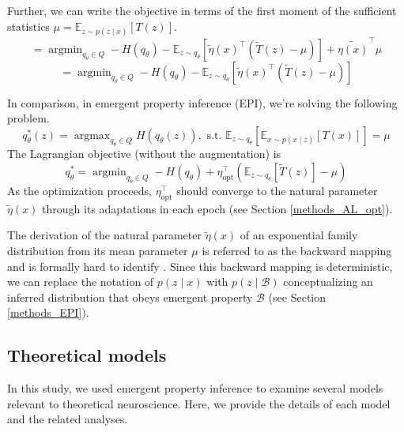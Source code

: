 \documentclass[11pt]{article}
\DeclareMathOperator*{\argmin}{argmin}
\DeclareMathOperator*{\argmax}{argmax}
\begin{document}
 Further, we can write the objective in terms of the first moment of the sufficient statistics $\mu = \mathbb{E}_{z \sim p(z \mid x)}\left[T(z) \right]$.
 \begin{equation}
=  \argmin_{q_\theta \in Q} -H(q_\theta) - \mathbb{E}_{z \sim q_\theta} \left[ \tilde{\eta}(x)^\top \left(  \tilde{T}(z) -\mu \right) \right] + \tilde{\eta(x)}^\top \mu
 \end{equation}
  \begin{equation}
=  \argmin_{q_\theta \in Q} -H(q_\theta) - \mathbb{E}_{z \sim q_\theta} \left[ \tilde{\eta}(x)^\top \left(  \tilde{T}(z) -\mu \right) \right]
 \end{equation}

In comparison, in emergent property inference (EPI), we're solving the following problem.
\begin{equation}
q_\theta^*(z) = \argmax_{q_\theta \in Q} H(q_\theta(z)),   \text{  s.t.  } \mathbb{E}_{z \sim q_\theta}\left[ \mathbb{E}_{x\sim p(x \mid z)}\left[T(x)\right] \right] = \mu
\end{equation}
The Lagrangian objective (without the augmentation) is
\begin{equation}
q_\theta^* = \argmin_{q_\theta \in Q} - H(q_\theta) + \eta_{\text{opt}}^\top \left(\mathbb{E}_{z \sim q_\theta} \left[\tilde{T}(z) \right] - \mu \right)
\end{equation}
As the optimization proceeds, $\eta_{\text{opt}}^\top$ should converge to the natural parameter $\tilde{\eta}(x)$ through its adaptations in each epoch (see Section \ref{methods_AL_opt}). 

The derivation of the natural parameter $\tilde{\eta}(x)$ of an exponential family distribution from its mean parameter $\mu$ is referred to as the backward mapping and is formally hard to identify \cite{wainwright2008graphical}.  Since this backward mapping is deterministic,  we can replace the notation of $p(z \mid x)$ with $p(z \mid \mathcal{B})$ conceptualizing an inferred distribution that obeys emergent property $\mathcal{B}$ (see Section \ref{methods_EPI}). 

\subsection{Theoretical models}\label{methods_theoretical_models}
In this study, we used emergent property inference to examine several models relevant to theoretical neuroscience.  Here, we provide the details of each model  and the related analyses.
\end{document}
